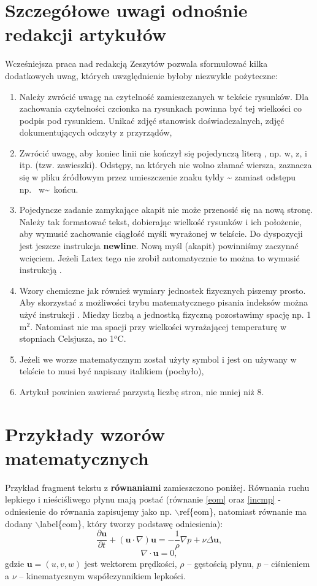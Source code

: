 \documentclass[polish,twoside]{article}
\begin{document}
\section{Szczegółowe uwagi odnośnie redakcji artykułów}
Wcześniejsza praca nad redakcją Zeszytów pozwala sformułować kilka dodatkowych uwag, których uwzględnienie byłoby niezwykle pożyteczne:
\begin{enumerate}
    \item Należy zwrócić uwagę na czytelność zamieszczanych w tekście rysunków. Dla zachowania czytelności czcionka na rysunkach powinna być tej wielkości co podpis pod rysunkiem. Unikać zdjęć stanowisk doświadczalnych, zdjęć dokumentujących odczyty z przyrządów,
    \item Zwrócić uwagę, aby koniec linii nie kończył się pojedynczą literą , np. w, z, i itp. (tzw. zawieszki). Odstępy, na których nie wolno złamać wiersza, zaznacza się w pliku źródłowym przez umieszczenie znaku tyldy \~{}  zamiast odstępu np.~ w\~{}~końcu.
    \item  Pojedyncze zadanie zamykające akapit nie może przenosić się na nową stronę. Należy tak formatować tekst, dobierając wielkość rysunków i ich położenie, aby wymusić zachowanie ciągłość myśli wyrażonej w tekście. Do dyspozycji jest jeszcze instrukcja \textbf{newline}. Nową myśl (akapit) powinniśmy zaczynać wcięciem. Jeżeli Latex tego nie zrobił automatycznie to można to wymusić instrukcją  \indent.
    \item Wzory  chemiczne  jak również wymiary jednostek fizycznych piszemy prosto. Aby skorzystać z możliwości trybu matematycznego pisania indeksów można użyć  instrukcji  . Miedzy liczbą a jednostką fizyczną pozostawimy spację np. 1 m$^2$. Natomiast nie ma spacji przy wielkości wyrażającej  temperaturę  w stopniach Celsjusza, no 1$^o$C.
    \item Jeżeli we worze matematycznym został użyty symbol i jest on używany w tekście to musi być napisany italikiem (pochyło),
    \item Artykuł powinien zawierać parzystą liczbę stron, nie mniej niż 8. 
\end{enumerate}

\section{Przykłady wzorów matematycznych}
Przykład fragment tekstu z \textbf{równaniami} zamieszczono poniżej.
Równania ruchu lepkiego i nieściśliwego płynu mają postać (równanie \ref{eom} oraz \ref{incmp} - odniesienie do równania zapisujemy jako np. $\backslash$ref\{eom\}, natomiast równanie ma dodany $\backslash$label\{eom\}, który tworzy podstawę odniesienia):
\begin{equation}\label{eom}
\frac{\partial{\mathbf{u}}}{\partial t}+(\mathbf{u} \cdot \nabla)\mathbf{u}=-\frac{1}{\rho}\nabla p+\nu \Delta \mathbf{u},
\end{equation}
\begin{equation}\label{incmp}
\nabla \cdot \mathbf{u}=0,
\end{equation}
gdzie $\mathbf{u}=(u,v,w)$ jest wektorem prędkości, $\rho$ -- gęstością płynu, $p$ -- ciśnieniem a $\nu$ -- kinematycznym współczynnikiem lepkości.
\end{document}
